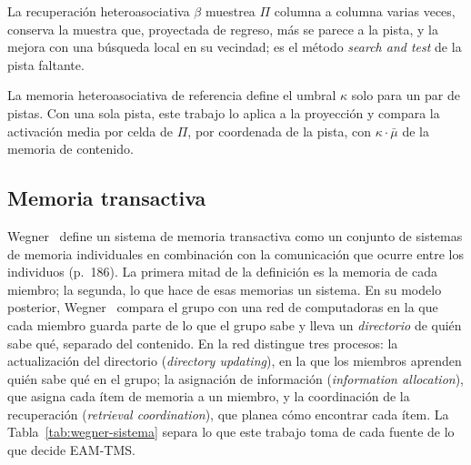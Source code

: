 La recuperación heteroasociativa $\beta$ muestrea $\Pi$ columna a columna varias veces,
conserva la muestra que, proyectada de regreso, más se parece a la pista, y la mejora
con una búsqueda local en su vecindad; es el método \emph{search and test} de la pista
faltante.

La memoria heteroasociativa de referencia define el umbral $\kappa$ solo para un par de
pistas.
Con una sola pista, este trabajo lo aplica a la proyección y compara la activación media
por celda de $\Pi$, por coordenada de la pista, con $\kappa \cdot \bar{\mu}$ de la
memoria de contenido.

\subsection{Memoria transactiva}
\label{sec:tmt}

Wegner~\cite{wegner1987transactive} define un sistema de memoria transactiva como un
conjunto de sistemas de memoria individuales en combinación con la comunicación que
ocurre entre los individuos (p.~186).
La primera mitad de la definición es la memoria de cada miembro; la segunda, lo que
hace de esas memorias un sistema.
En su modelo posterior, Wegner~\cite{wegner1995computer} compara el grupo con una red
de computadoras en la que cada miembro guarda parte de lo que el grupo sabe y lleva un
\emph{directorio} de quién sabe qué, separado del contenido.
En la red distingue tres procesos: la actualización del directorio (\emph{directory
updating}), en la que los miembros aprenden quién sabe qué en el grupo; la asignación
de información (\emph{information allocation}), que asigna cada ítem de memoria a un
miembro, y la coordinación de la recuperación (\emph{retrieval coordination}), que
planea cómo encontrar cada ítem.
La Tabla~\ref{tab:wegner-sistema} separa lo que este trabajo toma de cada fuente de lo
que decide EAM-TMS.


